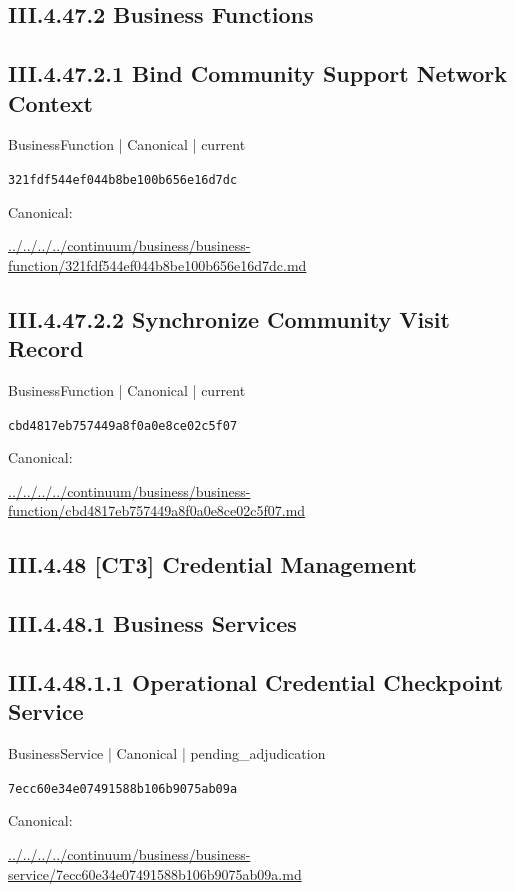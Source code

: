 \documentclass[10pt,a4paper]{article}
\begin{document}
\subsection*{III.4.47.2 Business Functions}
\subsection*{III.4.47.2.1 Bind Community Support Network Context}
{\small BusinessFunction | Canonical | current}\par
\texttt{321fdf544ef044b8be100b656e16d7dc}\par
Canonical: \par
{\footnotesize\url{../../../../continuum/business/business-function/321fdf544ef044b8be100b656e16d7dc.md}}\par
\subsection*{III.4.47.2.2 Synchronize Community Visit Record}
{\small BusinessFunction | Canonical | current}\par
\texttt{cbd4817eb757449a8f0a0e8ce02c5f07}\par
Canonical: \par
{\footnotesize\url{../../../../continuum/business/business-function/cbd4817eb757449a8f0a0e8ce02c5f07.md}}\par
\subsection*{III.4.48 [CT3] Credential Management}
\subsection*{III.4.48.1 Business Services}
\subsection*{III.4.48.1.1 Operational Credential Checkpoint Service}
{\small BusinessService | Canonical | pending\_adjudication}\par
\texttt{7ecc60e34e07491588b106b9075ab09a}\par
Canonical: \par
{\footnotesize\url{../../../../continuum/business/business-service/7ecc60e34e07491588b106b9075ab09a.md}}\par
\end{document}
